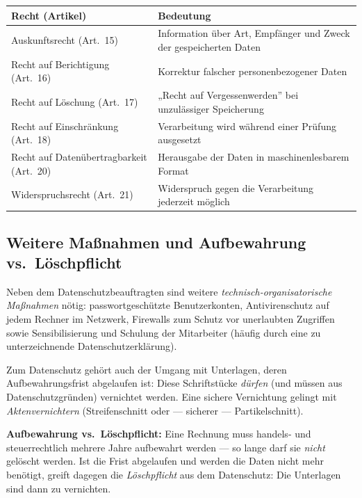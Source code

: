 \documentclass[11pt, a4paper]{article}
\begin{document}
\begin{center}
\begin{tabular}{p{5.2cm} p{6.6cm}}
\toprule
\textbf{Recht (Artikel)} & \textbf{Bedeutung}\\
\midrule
Auskunftsrecht (Art.~15) & Information über Art, Empfänger und Zweck der gespeicherten Daten\\
Recht auf Berichtigung (Art.~16) & Korrektur falscher personenbezogener Daten\\
Recht auf Löschung (Art.~17) & „Recht auf Vergessenwerden” bei unzulässiger Speicherung\\
Recht auf Einschränkung (Art.~18) & Verarbeitung wird während einer Prüfung ausgesetzt\\
Recht auf Datenübertragbarkeit (Art.~20) & Herausgabe der Daten in maschinenlesbarem Format\\
Widerspruchsrecht (Art.~21) & Widerspruch gegen die Verarbeitung jederzeit möglich\\
\bottomrule
\end{tabular}
\end{center}

\subsection{Weitere Maßnahmen und Aufbewahrung vs.\ Löschpflicht}

Neben dem Datenschutzbeauftragten sind weitere \emph{technisch-organisatorische
Maßnahmen} nötig: passwortgeschützte Benutzerkonten, Antivirenschutz auf jedem Rechner
im Netzwerk, Firewalls zum Schutz vor unerlaubten Zugriffen sowie Sensibilisierung und
Schulung der Mitarbeiter (häufig durch eine zu unterzeichnende Datenschutzerklärung).

Zum Datenschutz gehört auch der Umgang mit Unterlagen, deren Aufbewahrungsfrist
abgelaufen ist: Diese Schriftstücke \emph{dürfen} (und müssen aus Datenschutzgründen)
vernichtet werden. Eine sichere Vernichtung gelingt mit \emph{Aktenvernichtern}
(Streifenschnitt oder --- sicherer --- Partikelschnitt).

\begin{beispiel}
\textbf{Aufbewahrung vs.\ Löschpflicht:} Eine Rechnung muss handels- und steuerrechtlich
mehrere Jahre aufbewahrt werden --- so lange darf sie \emph{nicht} gelöscht werden.
Ist die Frist abgelaufen und werden die Daten nicht mehr benötigt, greift dagegen die
\emph{Löschpflicht} aus dem Datenschutz: Die Unterlagen sind dann zu vernichten.
\end{beispiel}
\end{document}
